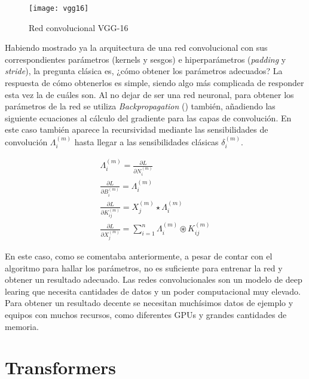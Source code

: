			\begin{figure}[!h]
				\centering
				\texttt{[image: vgg16]}
				\caption{Red convolucional VGG-16}
				\label{fig:vgg16}
			\end{figure}
			
			Habiendo mostrado ya la arquitectura de una red convolucional con sus correspondientes parámetros (kernels y sesgos) e hiperparámetros (\textit{padding} y \textit{stride}), la pregunta clásica es, ¿cómo obtener los parámetros adecuados? La respuesta de cómo obtenerlos es simple, siendo algo más complicada de responder esta vez la de cuáles son. Al no dejar de ser una red neuronal, para obtener los parámetros de la red se utiliza \textit{Backpropagation} () también, añadiendo las siguiente ecuaciones\cite{backpropCNN} al cálculo del gradiente para las capas de convolución. En este caso también aparece la recursividad mediante las sensibilidades de convolución $\Lambda_i^{(m)}$ hasta llegar a las sensibilidades clásicas $\delta_i^{(m)}$. 
			
			$$
			\begin{gathered}
				\Lambda_i^{(m)} = \frac{\partial L}{\partial N_i^{(m)}}\\
				\frac{\partial L}{\partial B_{i}^{(m)}} = \Lambda_i^{(m)}\\
				\frac{\partial L}{\partial K_{ij}^{(m)}} = X_j^{(m)}\star\Lambda_i^{(m)}\\
				\frac{\partial L}{\partial X_j^{(m)}} = \sum_{i = 1}^n\Lambda_i^{(m)}\circledast K_{ij}^{(m)}
			\end{gathered}
			$$
 		
			En este caso, como se comentaba anteriormente, a pesar de contar con el algoritmo para hallar los parámetros, no es suficiente para entrenar la red y obtener un resultado adecuado. Las redes convolucionales son un modelo de deep learing que necesita cantidades de datos y un poder computacional muy elevado. Para obtener un resultado decente se necesitan muchísimos datos de ejemplo y equipos con muchos recursos, como diferentes GPUs y grandes cantidades de memoria. 
			
		\section{Transformers}
			
